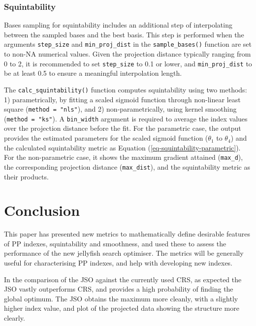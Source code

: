\documentclass[
  12pt,
]{interact}
\theoremstyle{plain}
\begin{document}
\hypertarget{squintability}{%
\subsubsection{Squintability}\label{squintability}}

Bases sampling for squintability includes an additional step of
interpolating between the sampled bases and the best basis. This step is
performed when the arguments \texttt{step\_size} and
\texttt{min\_proj\_dist} in the \texttt{sample\_bases()} function are
set to non-NA numerical values. Given the projection distance typically
ranging from 0 to 2, it is recommended to set \texttt{step\_size} to 0.1
or lower, and \texttt{min\_proj\_dist} to be at least 0.5 to ensure a
meaningful interpolation length.

The \texttt{calc\_squintability()} function computes squintability using
two methods: 1) parametrically, by fitting a scaled sigmoid function
through non-linear least square (\texttt{method\ =\ "nls"}), and 2)
non-parametrically, using kernel smoothing (\texttt{method\ =\ "ks"}). A
\texttt{bin\_width} argument is required to average the index values
over the projection distance before the fit. For the parametric case,
the output provides the estimated parameters for the scaled sigmoid
function (\(\theta_1\) to \(\theta_4\)) and the calculated squintability
metric as Equation (\ref{eq-squintability-parametric}). For the
non-parametric case, it shows the maximum gradient attained
(\texttt{max\_d}), the corresponding projection distance
(\texttt{max\_dist}), and the squintability metric as their products.

\hypertarget{sec-conclusion}{%
\section{Conclusion}\label{sec-conclusion}}

This paper has presented new metrics to mathematically define desirable
features of PP indexes, squintability and smoothness, and used these to
assess the performance of the new jellyfish search optimiser. The
metrics will be generally useful for characterising PP indexes, and help
with developing new indexes.

In the comparison of the JSO against the currently used CRS, as expected
the JSO vastly outperforms CRS, and provides a high probability of
finding the global optimum. The JSO obtains the maximum more cleanly,
with a slightly higher index value, and plot of the projected data
showing the structure more clearly.
\end{document}
